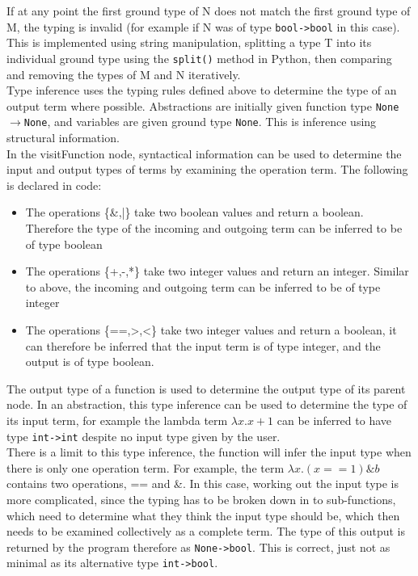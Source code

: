 \documentclass[a4paper,12pt]{report}
\begin{document}
If at any point the first ground type of N does not match the first ground type of M, the typing is invalid (for example if N was of type \texttt{bool->bool} in this case). This is implemented using string manipulation, splitting a type T into its individual ground type using the \texttt{split()} method in Python, then comparing and removing the types of M and N iteratively.\\

Type inference uses the typing rules defined above to determine the type of an output term where possible. Abstractions are initially given function type \texttt{None$\rightarrow$None}, and variables are given ground type \texttt{None}. This is inference using structural information.\\

In the visitFunction node, syntactical information can be used to determine the input and output types of terms by examining the operation term. The following is declared in code:

\begin{itemize}
	\item The operations \{\&,|\} take two boolean values and return a boolean. Therefore the type of the incoming and outgoing term can be inferred to be of type boolean
	\item The operations \{+,-,*\} take two integer values and return an integer. Similar to above, the incoming and outgoing term can be inferred to be of type integer
	\item The operations \{==,>,<\} take two integer values and return a boolean, it can therefore be inferred that the input term is of type integer, and the output is of type boolean. 
\end{itemize}

The output type of a function is used to determine the output type of its parent node. In an abstraction, this type inference can be used to determine the type of its input term, for example the lambda term $\lambda x.x+1$ can be inferred to have type \texttt{int->int} despite no input type given by the user.\\

There is a limit to this type inference, the function will infer the input type when there is only one operation term. For example, the term $\lambda x.(x==1)\&b$ contains two operations, == and \&. In this case, working out the input type is more complicated, since the typing has to be broken down in to sub-functions, which need to determine what they think the input type should be, which then needs to be examined collectively as a complete term. The type of this output is returned by the program therefore as \texttt{None->bool}. This is correct, just not as minimal as its alternative type \texttt{int->bool}.\\
\end{document}
